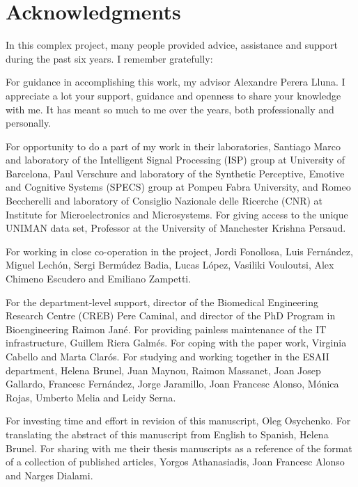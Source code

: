 
\chapter*{Acknowledgments}

In this complex project, many people provided advice, assistance and support
during the past six years. I remember gratefully:

For guidance in accomplishing this work, my advisor Alexandre Perera Lluna.
I appreciate a lot your support, guidance and openness to share your knowledge with me.
It has meant so much to me over the years, both professionally and personally. 

For opportunity to do a part of my work in their laboratories,
Santiago Marco and laboratory of the Intelligent Signal Processing (ISP) group 
at University of Barcelona,
Paul Verschure and laboratory of the Synthetic Perceptive, Emotive and Cognitive Systems (SPECS) group
at Pompeu Fabra University, and 
Romeo Beccherelli and laboratory of Consiglio Nazionale delle Ricerche (CNR)
at Institute for Microelectronics and Microsystems.
For giving access to the unique UNIMAN data set, 
Professor at the University of Manchester Krishna Persaud.

For working in close co-operation in the \Neurochem project,
Jordi Fonollosa, Luis Fern\'{a}ndez, Miguel Lech\'{o}n,
Sergi Berm\'{u}dez Badia, 
Lucas L\'{o}pez, Vasiliki Vouloutsi, Alex Chimeno Escudero
and Emiliano Zampetti.

For the department-level support, 
director of the Biomedical Engineering Research Centre (CREB) Pere Caminal, and 
director of the PhD Program in Bioengineering Raimon Jan\'{e}.
For providing painless maintenance of the IT infrastructure, 
Guillem Riera Galm\'{e}s.
For coping with the paper work, Virginia Cabello and Marta Clar\'{o}s.
For studying and working together in the ESAII department, 
Helena Brunel, Juan Maynou, Raimon Massanet, Joan Josep Gallardo, Francesc Fern\'{a}ndez,
Jorge Jaramillo, Joan Francesc Alonso, M\'{o}nica Rojas, Umberto Melia and Leidy Serna.

For investing time and effort in revision of this manuscript, Oleg Osychenko. 
For translating the abstract of this manuscript from English to Spanish, Helena Brunel.
For sharing with me their thesis manuscripts as a reference
of the format of a collection of published articles,
Yorgos Athanasiadis, Joan Francesc Alonso and Narges Dialami.

